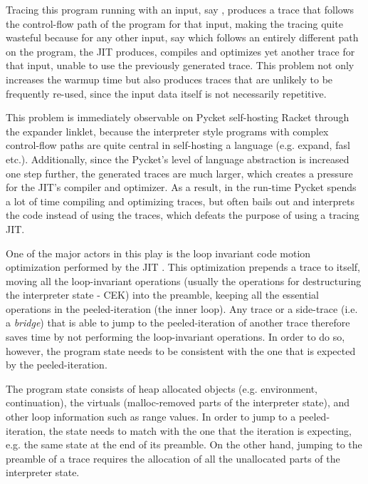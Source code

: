 Tracing this program running with an input, say ,
produces a trace that follows the control-flow path of the program for
that input, making the tracing quite wasteful because for any other
input, say  which follows an entirely different
path on the program, the JIT produces, compiles and optimizes yet
another trace for that input, unable to use the previously generated
trace. This problem not only increases the warmup time but also
produces traces that are unlikely to be frequently re-used, since the
input data itself is not necessarily repetitive.

This problem is immediately observable on Pycket self-hosting Racket
through the expander linklet, because the interpreter style programs
with complex control-flow paths are quite central in self-hosting a
language (e.g. expand, fasl etc.). Additionally, since the Pycket's
level of language abstraction is increased one step further, the
generated traces are much larger, which creates a pressure for the
JIT's compiler and optimizer. As a result, in the run-time Pycket
spends a lot of time compiling and optimizing traces, but often bails
out and interprets the code instead of using the traces, which defeats
the purpose of using a tracing JIT.

One of the major actors in this play is the loop invariant code motion
optimization performed by the JIT \cite{loop-aware:12}. This
optimization prepends a trace to itself, moving all the loop-invariant
operations (usually the operations for destructuring the interpreter
state - CEK) into the preamble, keeping all the essential operations
in the peeled-iteration (the inner loop). Any trace or a side-trace
(i.e. a \emph{bridge}) that is able to jump to the peeled-iteration of
another trace therefore saves time by not performing the
loop-invariant operations. In order to do so, however, the program
state needs to be consistent with the one that is expected by the
peeled-iteration.

The program state consists of heap allocated objects
(e.g. environment, continuation), the virtuals (malloc-removed parts
of the interpreter state), and other loop information such as range
values. In order to jump to a peeled-iteration, the state needs to
match with the one that the iteration is expecting, e.g. the same
state at the end of its preamble. On the other hand, jumping to the
preamble of a trace requires the allocation of all the unallocated
parts of the interpreter state.





